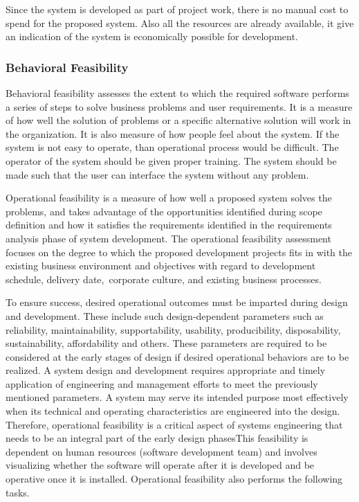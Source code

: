 Since the system is developed as part of project work, there is no manual cost to spend for the proposed system. Also all the resources are already available, it give an indication of the system is economically possible for development.

\subsubsection{Behavioral Feasibility}
Behavioral feasibility assesses the extent to which the required software performs a series of steps to solve business problems and user requirements. It is a measure of how well the solution of problems or a specific alternative solution will work in the organization. It is also measure of how people feel about the system. If the system is not easy to operate, than operational process would be difficult. The operator of the system should be given proper training. The system should be made such that the user can interface the system without any problem.

Operational feasibility is a measure of how well a proposed system solves the problems, and takes advantage of the opportunities identified during scope definition and how it satisfies the requirements identified in the requirements analysis phase of system development. The operational feasibility assessment focuses on the degree to which the proposed development projects fits in with the existing business environment and objectives with regard to development schedule, delivery date, corporate culture, and existing business processes.

To ensure success, desired operational outcomes must be imparted during design and development. These include such design-dependent parameters such as reliability, maintainability, supportability, usability, producibility, disposability, sustainability, affordability and others. These parameters are required to be considered at the early stages of design if desired operational behaviors are to be realized. A system design and development requires appropriate and timely application of engineering and management efforts to meet the previously mentioned parameters. A system may serve its intended purpose most effectively when its technical and operating characteristics are engineered into the design. Therefore, operational feasibility is a critical aspect of systems engineering that needs to be an integral part of the early design phasesThis feasibility is dependent on human resources (software development team) and involves visualizing whether the software will operate after it is developed and be operative once it is installed. Operational feasibility also performs the following tasks.

